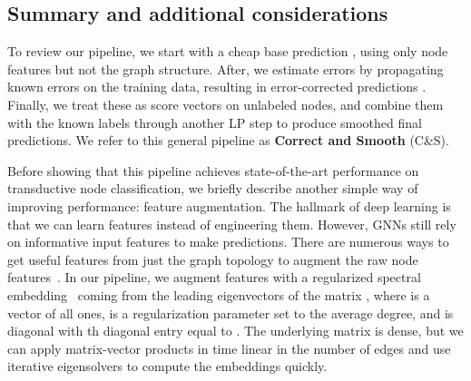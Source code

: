 \documentclass{article}
\begin{document}
\subsection{Summary and additional considerations}
To review our pipeline, we start with a cheap base prediction , using only node features but not the graph structure.
After, we estimate errors  by propagating known errors on the training data,
resulting in error-corrected predictions .
Finally, we treat these as score vectors on unlabeled nodes, and combine them
with the known labels through another LP step to produce smoothed final predictions.
We refer to this general pipeline as \textbf{Correct and Smooth} (C\&S).

Before showing that this pipeline achieves state-of-the-art performance
on transductive node classification, we briefly describe another simple way of improving performance:
feature augmentation.
The hallmark of deep learning is that we can learn features instead of engineering them.
However, GNNs still rely on informative input features to make predictions.
There are numerous ways to get useful features from just the graph topology to augment the raw node features~\citep{henderson2011s,henderson2012rolx,Hamilton-2017-representation}.
In our pipeline, we augment features with a regularized spectral embedding~\citep{chaudhuri2012spectral,zhang2018understanding} 
coming from the leading  eigenvectors of the matrix
,
where  is a vector of all ones, 
 is a regularization parameter set to the average degree, and
 is diagonal with th diagonal entry equal to .
The underlying matrix is dense, but we can apply matrix-vector products in time linear in the number of edges
and use iterative eigensolvers to compute the embeddings quickly.
\end{document}
